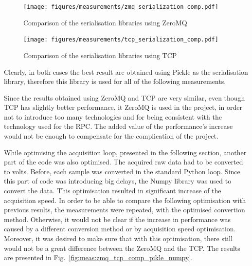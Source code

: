         \begin{figure}
            \centering
            \begin{minipage}[b]{0.8\textwidth}
            	\texttt{[image: figures/measurements/zmq\_serialization\_comp.pdf]}
            	\caption{Comparison of the serialisation libraries using ZeroMQ}
            	\label{fig:meas:ser_comp_zmq}
            \end{minipage}
            \vfill
            \vspace{1cm}
            \begin{minipage}[b]{0.8\textwidth}
            	\texttt{[image: figures/measurements/tcp\_serialization\_comp.pdf]}
            	\caption{Comparison of the serialisation libraries using TCP}
            	\label{fig:meas:ser_comp_tcp}
            \end{minipage}
        \end{figure}

        Clearly, in both cases the best result are obtained using Pickle as the serialisation library, therefore this library is used for all of the following measurements.
         
        Since the results obtained using ZeroMQ and TCP are very similar, even though TCP has slightly better performance, it ZeroMQ is used in the project, in order not to introduce too many technologies and for being consistent with the technology used for the RPC. The added value of the performance's increase would not be enough to compensate for the complication of the project.
        
        While optimising the acquisition loop, presented in the following section, another part of the code was also optimised. The acquired raw data had to be converted to volts. Before, each sample was converted in the standard Python loop. Since this part of code was introducing big delays, the Numpy \cite{numpy} library was used to convert the data. This optimisation resulted in significant increase of the acquisition speed. In order to be able to compare the following optimisation with previous results, the measurements were repeated, with the optimised convertion method. Otherwise, it would not be clear if the increase in performance was caused by a different conversion method or by acquisition speed optimisation. Moreover, it was desired to make sure that with this optimisation, there still would not be a great difference between the ZeroMQ and the TCP. The results are presented in Fig.~\ref{fig:meas:zmq_tcp_comp_pikle_numpy}. 
        

